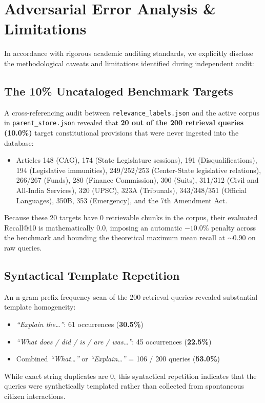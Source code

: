 \documentclass[10pt,twocolumn]{article}
\begin{document}
\section{Adversarial Error Analysis \& Limitations}
\label{sec:limitations}

In accordance with rigorous academic auditing standards, we explicitly disclose the methodological caveats and limitations identified during independent audit:

\subsection{The 10\% Uncataloged Benchmark Targets}
A cross-referencing audit between \texttt{relevance\_labels.json} and the active corpus in \texttt{parent\_store.json} revealed that \textbf{20 out of the 200 retrieval queries (10.0\%)} target constitutional provisions that were never ingested into the database:
\begin{itemize}[leftmargin=*]
    \item Articles 148 (CAG), 174 (State Legislature sessions), 191 (Disqualifications), 194 (Legislative immunities), 249/252/253 (Center-State legislative relations), 266/267 (Funds), 280 (Finance Commission), 300 (Suits), 311/312 (Civil and All-India Services), 320 (UPSC), 323A (Tribunals), 343/348/351 (Official Languages), 350B, 353 (Emergency), and the 7th Amendment Act.
\end{itemize}
Because these 20 targets have 0 retrievable chunks in the corpus, their evaluated Recall@10 is mathematically 0.0, imposing an automatic $-10.0\%$ penalty across the benchmark and bounding the theoretical maximum mean recall at $\sim$0.90 on raw queries.

\subsection{Syntactical Template Repetition}
An n-gram prefix frequency scan of the 200 retrieval queries revealed substantial template homogeneity:
\begin{itemize}[leftmargin=*]
    \item \textit{``Explain the\dots''}: 61 occurrences (\textbf{30.5\%})
    \item \textit{``What does / did / is / are / was\dots''}: 45 occurrences (\textbf{22.5\%})
    \item Combined \textit{``What\dots''} or \textit{``Explain\dots''} = 106 / 200 queries (\textbf{53.0\%})
\end{itemize}
While exact string duplicates are 0, this syntactical repetition indicates that the queries were synthetically templated rather than collected from spontaneous citizen interactions.
\end{document}

